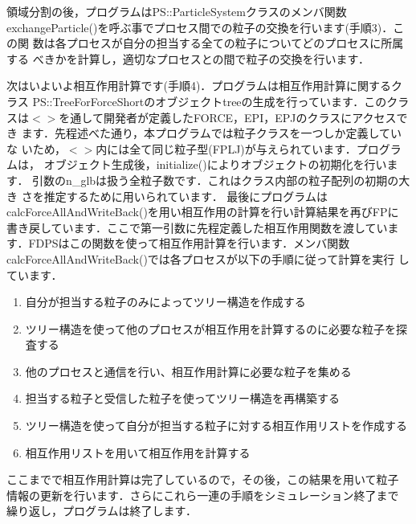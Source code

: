 \documentclass[twocolumn,10pt]{jarticle}
\begin{document}
領域分割の後，プログラムはPS::ParticleSystemクラスのメンバ関数
exchangeParticle()を呼ぶ事でプロセス間での粒子の交換を行います(手順3)．この関
数は各プロセスが自分の担当する全ての粒子についてどのプロセスに所属する
べきかを計算し，適切なプロセスとの間で粒子の交換を行います．

次はいよいよ相互作用計算です(手順4)．プログラムは相互作用計算に関するクラス
PS::TreeForForceShortのオブジェクトtreeの生成を行っています．このクラ
スは$<>$を通して開発者が定義したFORCE，EPI，EPJのクラスにアクセスでき
ます．先程述べた通り，本プログラムでは粒子クラスを一つしか定義していな
いため，$<>$内には全て同じ粒子型(FPLJ)が与えられています．プログラムは，
オブジェクト生成後，initialize()によりオブジェクトの初期化を行います．
引数のn\_glbは扱う全粒子数です．これはクラス内部の粒子配列の初期の大き
さを推定するために用いられています． 最後にプログラムは
calcForceAllAndWriteBack()を用い相互作用の計算を行い計算結果を再びFPに
書き戻しています．ここで第一引数に先程定義した相互作用関数を渡していま
す．FDPSはこの関数を使って相互作用計算を行います．メンバ関数
calcForceAllAndWriteBack()では各プロセスが以下の手順に従って計算を実行
しています．

\begin{enumerate}
\item 自分が担当する粒子のみによってツリー構造を作成する
\item ツリー構造を使って他のプロセスが相互作用を計算するのに必要な粒子を探査する
\item 他のプロセスと通信を行い、相互作用計算に必要な粒子を集める
\item 担当する粒子と受信した粒子を使ってツリー構造を再構築する
\item ツリー構造を使って自分が担当する粒子に対する相互作用リストを作成する
\item 相互作用リストを用いて相互作用を計算する
\end{enumerate}

ここまでで相互作用計算は完了しているので，その後，この結果を用いて粒子
情報の更新を行います．さらにこれら一連の手順をシミュレーション終了まで
繰り返し，プログラムは終了します．
\end{document}
